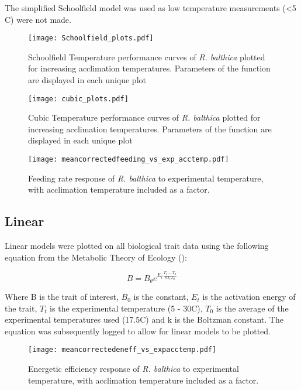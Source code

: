 \documentclass[../../Paper.tex]{subfiles}
\begin{document}
The simplified Schoolfield model was used
as low temperature measurements (\textless 5 \degree C) were not made. 


\begin{figure*}[!t]
\centering
\texttt{[image: Schoolfield\_plots.pdf]}
\caption{Schoolfield Temperature performance curves of \textit{R. balthica} plotted for increasing 
acclimation temperatures. Parameters of the function are displayed in each 
unique plot}
\end{figure*}

\begin{figure*}[!t]
\centering
\texttt{[image: cubic\_plots.pdf]}
\caption{Cubic Temperature performance curves of \textit{R. balthica} plotted for increasing 
acclimation temperatures. Parameters of the function are displayed in each 
unique plot}
\end{figure*}

\begin{figure*}[!b]

\centering
\texttt{[image: meancorrectedfeeding\_vs\_exp\_acctemp.pdf]}
\caption{Feeding rate response of \textit{R. balthica} to experimental temperature, with    
acclimation temperature included as a factor.}
\end{figure*}

\subsection*{Linear}

Linear models were plotted on all biological trait data using 
the following equation from the Metabolic Theory of Ecology 
(\cite{gillooly_effects_2001,savage_effects_2004}):

\begin{equation}
B = B_{\theta} e^{E_t\frac{T_t - T_0}{kT_tT_0}}
\end{equation}

Where B is the trait of interest, $B_0$ is the constant, $E_t$ is the 
activation energy of the trait, $T_t$ is the experimental temperature (5 - 
30\degree C), $T_0$ is the average of the experimental temperatures used (17.5\degree C) and k is the Boltzman constant. The equation was subsequently logged to allow for linear models to be plotted.


\begin{figure*}[!b]

\centering
\texttt{[image: meancorrectedeneff\_vs\_expacctemp.pdf]}
\caption{Energetic efficiency response of \textit{R. balthica} to experimental temperature, with    
acclimation temperature included as a factor.}
\end{figure*}
\end{document}
